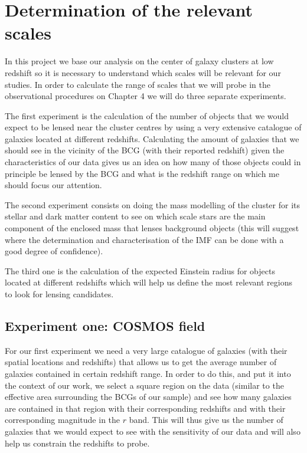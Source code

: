 \chapter{Determination of the relevant scales}

In this project we base our analysis on the center of galaxy clusters at low redshift so it is necessary to understand which scales will be relevant for our studies. In order to calculate the range of scales that we will probe in the observational procedures on Chapter 4 we will do three separate experiments. 

The first experiment is the calculation of the number of objects that we would expect to be lensed near the cluster centres by using a very extensive catalogue of galaxies located at different redshifts. Calculating the amount of galaxies that we should see in the vicinity of the BCG (with their reported redshift) given the characteristics of our data gives us an idea on how many of those objects could in principle be lensed by the BCG and what is the redshift range on which me should focus our attention. 

The second experiment consists on doing the mass modelling of the cluster for its stellar and dark matter content to see on which scale stars are the main component of the enclosed mass that lenses background objects (this will suggest where the determination and characterisation of the IMF can be done with a good degree of confidence). 

The third one is the calculation of the expected Einstein radius for objects located at different redshifts which will help us define the most relevant regions to look for lensing candidates.

\section{Experiment one: COSMOS field}

For our first experiment we need a very large catalogue of galaxies (with their spatial locations and redshifts) that allows us to get the average number of galaxies contained in certain redshift range. In order to do this, and put it into the context of our work, we select a square region on the data (similar to the effective area surrounding the BCGs of our sample) and see how many galaxies are contained in that region with their corresponding redshifts and with their corresponding magnitude in the $r$ band. This will thus give us the number of galaxies that we would expect to see with the sensitivity of our data and will also help us constrain the redshifts to probe. 

